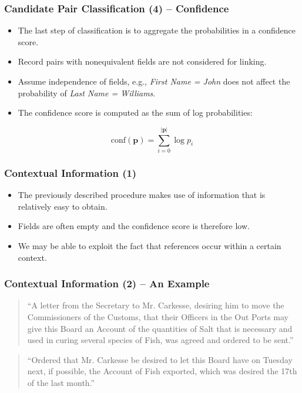 \documentclass[12pt]{beamer}
\theoremstyle{break}
\begin{document}
\begin{frame}
	\frametitle{Candidate Pair Classification (4) -- Confidence}
	
	\begin{itemize}
		\item The last step of classification is to aggregate the probabilities in a \alert{confidence score}.
		\item Record pairs with nonequivalent fields are not considered for linking.
		\item Assume \alert{independence} of fields, e.g., \textit{First Name = John} does not affect the probability of \textit{Last Name = Williams}.
		\item The confidence score is computed as the sum of log probabilities:
	\end{itemize}
	
	\begin{equation*}
		\mathrm{conf}(\bm{p})=\sum_{i=0}^{\left\vert \bm{p} \right\vert}\log{p_i}
	\end{equation*}

\end{frame}




\begin{frame}
	\frametitle{Contextual Information (1)}
	
	\begin{itemize}
		\item The previously described procedure makes use of information that is relatively easy to obtain.
		\item Fields are often empty and the confidence score is therefore low.
		\item We may be able to exploit the fact that references occur within a certain \alert{context}.
	\end{itemize}

\end{frame}




\begin{frame}
	\frametitle{Contextual Information (2) -- An Example}

	\begin{quote}
	    ``A letter from the Secretary to Mr. Carkesse, desiring him to move the Commissioners of the Customs, that their Officers in the Out Ports may give this Board an Account of the quantities of Salt that is necessary and used in curing several species of Fish, was agreed and ordered to be sent.''
	\end{quote}
	
	\bigskip
	
	\begin{quote}
	    ``Ordered that Mr. Carkesse be desired to let this Board have on Tuesday next, if possible, the Account of Fish exported, which was desired the 17th of the last month.''
	\end{quote}
	
\end{frame}
\end{document}
